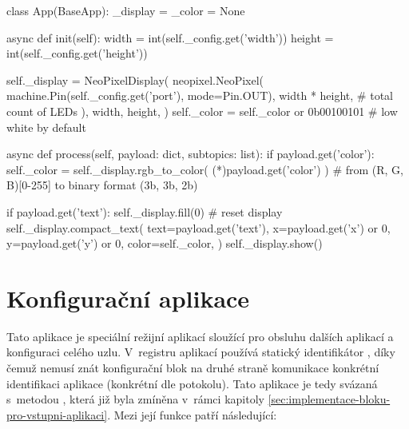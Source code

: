 \begin{code}[
    language=Python,
    caption={Ukázka z~implementace výstupní aplikace -- v~korutině \ic{init} aplikace připraví ovladač na základě
    parametrů doručených z~editoru. Korutina \ic{process} zodpovědná za zpracování příchozí zprávy následně tento
    ovladač řídí -- dle nastavené barvy a textu odešle požadavek na displej.},
    label=code:np-display-app
]
class App(BaseApp):
    _display = _color = None

    async def init(self):
        width = int(self._config.get('width'))
        height = int(self._config.get('height'))

        self._display = NeoPixelDisplay(
            neopixel.NeoPixel(
                machine.Pin(self._config.get('port'), mode=Pin.OUT),
                width * height,  # total count of LEDs
            ),
            width, height,
        )
        self._color = self._color or 0b00100101  # low white by default

    async def process(self, payload: dict, subtopics: list):
        if payload.get('color'):
            self._color = self._display.rgb_to_color(
                (*\textasteriskcentered*)payload.get('color')
            )  # from (R, G, B)[0-255] to binary format (3b, 3b, 2b)

        if payload.get('text'):
            self._display.fill(0)  # reset display
            self._display.compact_text(
                text=payload.get('text'),
                x=payload.get('x') or 0,
                y=payload.get('y') or 0,
                color=self._color,
            )
            self._display.show()
\end{code}


\section{Konfigurační aplikace}\label{sec:konfiguracni-aplikace}

Tato aplikace je speciální režijní aplikací sloužící pro obsluhu dalších aplikací a
konfiguraci celého uzlu. V~registru aplikací používá statický identifikátor ,
díky čemuž nemusí znát konfigurační blok  na druhé straně komunikace konkrétní
identifikaci aplikace (konkrétní  dle potokolu). Tato aplikace je tedy svázaná
s~metodou , která již byla zmíněna v~rámci kapitoly
\ref{sec:implementace-bloku-pro-vstupni-aplikaci}. Mezi její funkce patří následující:

